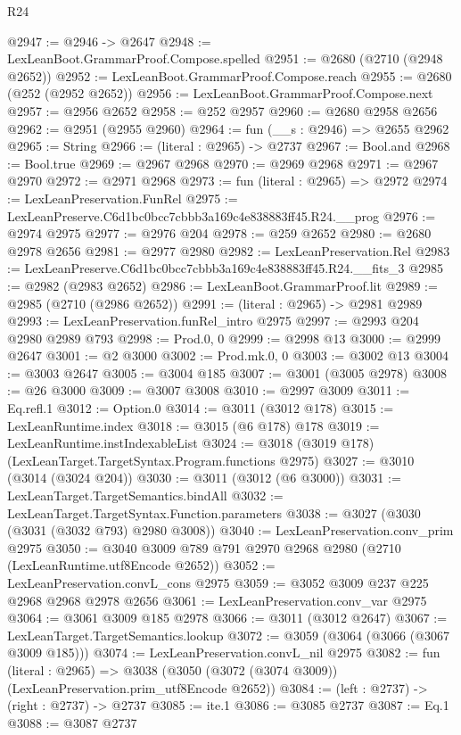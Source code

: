 \begin{lexlean}{R24}
\begin{coremodule}
@2947 := @2946 -> @2647
@2948 := LexLeanBoot.GrammarProof.Compose.spelled
@2951 := @2680 (@2710 (@2948 @2652))
@2952 := LexLeanBoot.GrammarProof.Compose.reach
@2955 := @2680 (@252 (@2952 @2652))
@2956 := LexLeanBoot.GrammarProof.Compose.next
@2957 := @2956 @2652
@2958 := @252 @2957
@2960 := @2680 @2958 @2656
@2962 := @2951 (@2955 @2960)
@2964 := fun (__s : @2946) => @2655 @2962
@2965 := String
@2966 := (literal : @2965) -> @2737
@2967 := Bool.and
@2968 := Bool.true
@2969 := @2967 @2968
@2970 := @2969 @2968
@2971 := @2967 @2970
@2972 := @2971 @2968
@2973 := fun (literal : @2965) => @2972
@2974 := LexLeanPreservation.FunRel
@2975 := LexLeanPreserve.C6d1bc0bcc7cbbb3a169c4e838883ff45.R24.__prog
@2976 := @2974 @2975
@2977 := @2976 @204
@2978 := @259 @2652
@2980 := @2680 @2978 @2656
@2981 := @2977 @2980
@2982 := LexLeanPreservation.Rel
@2983 := LexLeanPreserve.C6d1bc0bcc7cbbb3a169c4e838883ff45.R24.__fits_3
@2985 := @2982 (@2983 @2652)
@2986 := LexLeanBoot.GrammarProof.lit
@2989 := @2985 (@2710 (@2986 @2652))
@2991 := (literal : @2965) -> @2981 @2989
@2993 := LexLeanPreservation.funRel_intro @2975
@2997 := @2993 @204 @2980 @2989 @793
@2998 := Prod.{0, 0}
@2999 := @2998 @13
@3000 := @2999 @2647
@3001 := @2 @3000
@3002 := Prod.mk.{0, 0}
@3003 := @3002 @13
@3004 := @3003 @2647
@3005 := @3004 @185
@3007 := @3001 (@3005 @2978)
@3008 := @26 @3000
@3009 := @3007 @3008
@3010 := @2997 @3009
@3011 := Eq.refl.{1}
@3012 := Option.{0}
@3014 := @3011 (@3012 @178)
@3015 := LexLeanRuntime.index
@3018 := @3015 (@6 @178) @178
@3019 := LexLeanRuntime.instIndexableList
@3024 := @3018 (@3019 @178) (LexLeanTarget.TargetSyntax.Program.functions @2975)
@3027 := @3010 (@3014 (@3024 @204))
@3030 := @3011 (@3012 (@6 @3000))
@3031 := LexLeanTarget.TargetSemantics.bindAll
@3032 := LexLeanTarget.TargetSyntax.Function.parameters
@3038 := @3027 (@3030 (@3031 (@3032 @793) @2980 @3008))
@3040 := LexLeanPreservation.conv_prim @2975
@3050 := @3040 @3009 @789 @791 @2970 @2968 @2980 (@2710 (LexLeanRuntime.utf8Encode @2652))
@3052 := LexLeanPreservation.convL_cons @2975
@3059 := @3052 @3009 @237 @225 @2968 @2968 @2978 @2656
@3061 := LexLeanPreservation.conv_var @2975
@3064 := @3061 @3009 @185 @2978
@3066 := @3011 (@3012 @2647)
@3067 := LexLeanTarget.TargetSemantics.lookup
@3072 := @3059 (@3064 (@3066 (@3067 @3009 @185)))
@3074 := LexLeanPreservation.convL_nil @2975
@3082 := fun (literal : @2965) =>
  @3038 (@3050 (@3072 (@3074 @3009)) (LexLeanPreservation.prim_utf8Encode @2652))
@3084 := (left : @2737) -> (right : @2737) -> @2737
@3085 := ite.{1}
@3086 := @3085 @2737
@3087 := Eq.{1}
@3088 := @3087 @2737

\end{coremodule}
\end{lexlean}

